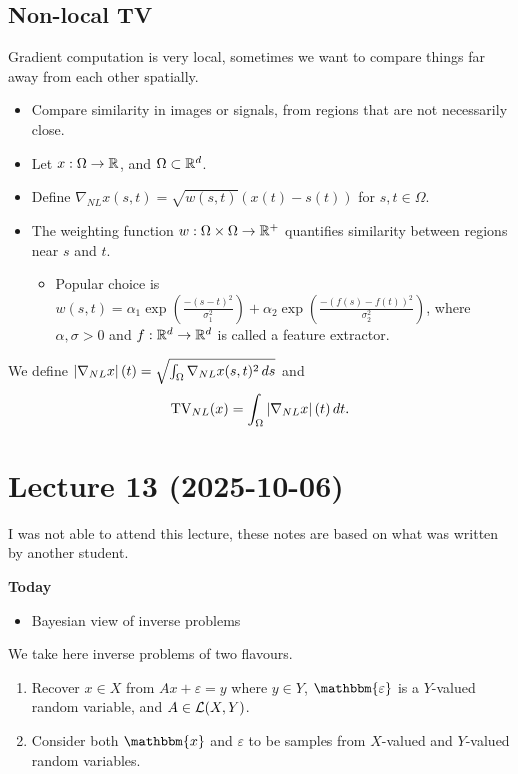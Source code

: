 \documentclass[12pt]{article}
\begin{document}
\subsection{Non-local TV}
Gradient computation is very local, sometimes we want to compare things far away from each other spatially. 
\begin{itemize}
    \item Compare similarity in images or signals, from regions that are not necessarily close. 
    \item Let $x:\Omega\to\mathbb{R}$, and $\Omega\subset \mathbb{R}^d$. 
    \item Define $\nabla_{NL}x(s,t) = \sqrt{w(s,t)}(x(t)-s(t))$ for $s,t\in\Omega$.
    \item The weighting function $w:\Omega\times\Omega\to\mathbb{R}^+$ quantifies similarity between regions near $s$ and $t$. 
    \begin{itemize}
        \item Popular choice is $w(s,t) = \alpha_1\exp\left(\frac{-(s-t)^2}{\sigma_1^2}\right)+ \alpha_2 \exp\left(\frac{-(f(s)-f(t))^2}{\sigma_2^2}\right)$, where $\alpha,\sigma>0$ and $f:\mathbb{R}^d\to \mathbb{R}^d$ is called a feature extractor.
    \end{itemize}
\end{itemize}
\begin{definition}
    We define $\left|\nabla_{NL}x\right|(t) = \sqrt{\int_\Omega \nabla_{NL}x(s,t)^2\, ds}$ and 
    \begin{equation*}
        \operatorname{TV}_{NL}(x) = \int_\Omega \left|\nabla_{NL}x\right|(t)\, dt.
    \end{equation*}
\end{definition}


\newpage
\section{Lecture 13 (2025-10-06)}
I was not able to attend this lecture, these notes are based on what was written by another student.

\textbf{Today}
\begin{itemize}
    \item Bayesian view of inverse problems
\end{itemize}

We take here inverse problems of two flavours.
\begin{enumerate}[label=(\roman*)]
    \item Recover $x\in X$ from $Ax + \varepsilon = y$ where $y\in Y$, $\mathbbm{\varepsilon}$ is a $Y$-valued random variable, and $A\in\mathcal{L}(X,Y)$.
    \item Consider both $\mathbbm{x}$ and $\mathbb{\varepsilon}$ to be samples from $X$-valued and $Y$-valued random variables.
\end{enumerate}
\end{document}
